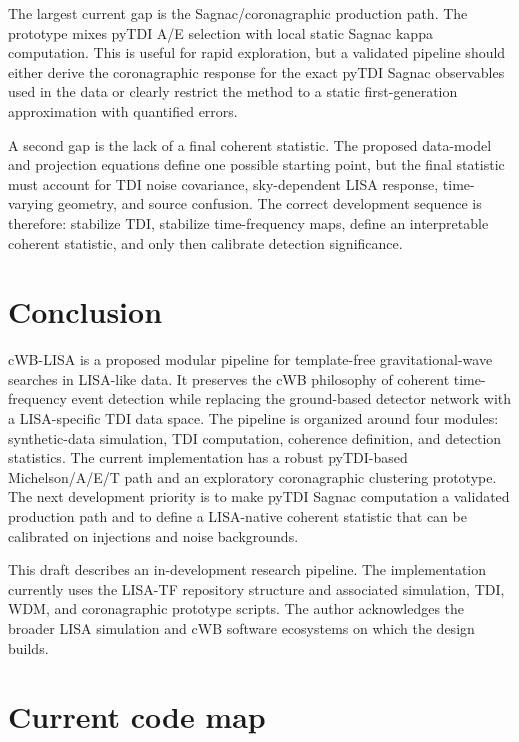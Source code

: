 \documentclass[%
 reprint,
 amsmath,amssymb,
 aps,
 prd,
]{revtex4-2}
\begin{document}
The largest current gap is the Sagnac/coronagraphic production path.  The prototype mixes pyTDI A/E selection with local static Sagnac kappa computation.  This is useful for rapid exploration, but a validated pipeline should either derive the coronagraphic response for the exact pyTDI Sagnac observables used in the data or clearly restrict the method to a static first-generation approximation with quantified errors.

A second gap is the lack of a final coherent statistic.  The proposed data-model and projection equations define one possible starting point, but the final statistic must account for TDI noise covariance, sky-dependent LISA response, time-varying geometry, and source confusion.  The correct development sequence is therefore: stabilize TDI, stabilize time-frequency maps, define an interpretable coherent statistic, and only then calibrate detection significance.

\section{Conclusion}
\label{sec:conclusion}

cWB-LISA is a proposed modular pipeline for template-free gravitational-wave searches in LISA-like data.  It preserves the cWB philosophy of coherent time-frequency event detection while replacing the ground-based detector network with a LISA-specific TDI data space.  The pipeline is organized around four modules: synthetic-data simulation, TDI computation, coherence definition, and detection statistics.  The current implementation has a robust pyTDI-based Michelson/A/E/T path and an exploratory coronagraphic clustering prototype.  The next development priority is to make pyTDI Sagnac computation a validated production path and to define a LISA-native coherent statistic that can be calibrated on injections and noise backgrounds.

\begin{acknowledgments}
This draft describes an in-development research pipeline.  The implementation currently uses the LISA-TF repository structure and associated simulation, TDI, WDM, and coronagraphic prototype scripts.  The author acknowledges the broader LISA simulation and cWB software ecosystems on which the design builds.
\end{acknowledgments}

\appendix

\section{Current code map}
\label{app:code_map}
\end{document}
